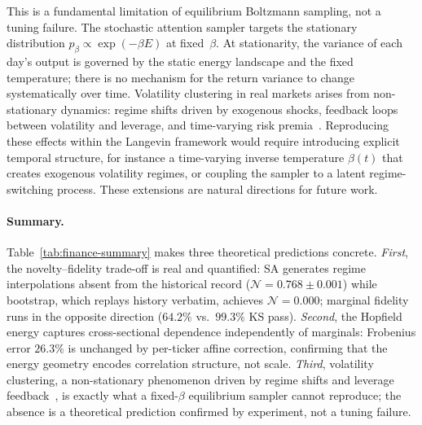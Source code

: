 This is a fundamental limitation of equilibrium Boltzmann sampling, not a tuning failure. The stochastic attention sampler targets the stationary distribution $p_\beta \propto \exp(-\beta E)$ at fixed~$\beta$. At stationarity, the variance of each day's output is governed by the static energy landscape and the fixed temperature; there is no mechanism for the return variance to change systematically over time. Volatility clustering in real markets arises from non-stationary dynamics: regime shifts driven by exogenous shocks, feedback loops between volatility and leverage, and time-varying risk premia~\cite{contStylizedFactsAsset2001}. Reproducing these effects within the Langevin framework would require introducing explicit temporal structure, for instance a time-varying inverse temperature $\beta(t)$ that creates exogenous volatility regimes, or coupling the sampler to a latent regime-switching process. These extensions are natural directions for future work.

\paragraph{Summary.}
Table~\ref{tab:finance-summary} makes three theoretical predictions concrete. \emph{First}, the novelty--fidelity trade-off is real and quantified: SA generates regime interpolations absent from the historical record ($\mathcal{N}=0.768\pm0.001$) while bootstrap, which replays history verbatim, achieves $\mathcal{N}=0.000$; marginal fidelity runs in the opposite direction ($64.2\%$ vs.\ $99.3\%$ KS pass). \emph{Second}, the Hopfield energy captures cross-sectional dependence independently of marginals: Frobenius error $26.3\%$ is unchanged by per-ticker affine correction, confirming that the energy geometry encodes correlation structure, not scale. \emph{Third}, volatility clustering, a non-stationary phenomenon driven by regime shifts and leverage feedback~\cite{contStylizedFactsAsset2001}, is exactly what a fixed-$\beta$ equilibrium sampler cannot reproduce; the absence is a theoretical prediction confirmed by experiment, not a tuning failure.

